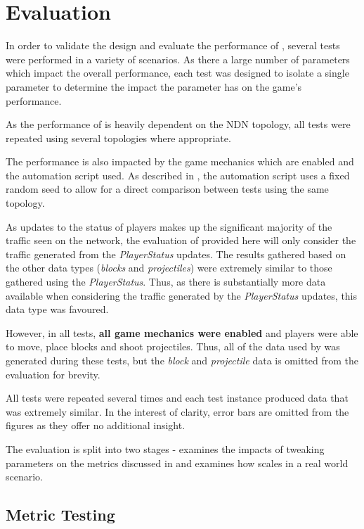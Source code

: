 \chapter{Evaluation}\label{sec:eval}
In order to validate the design and evaluate the performance of \game{}, several tests were performed in a variety of scenarios. As there a large number of parameters which impact the overall performance, each test was designed to isolate a single parameter to determine the impact the parameter has on the game's performance.

As the performance of \game{} is heavily dependent on the NDN topology, all tests were repeated using several topologies where appropriate.

The performance is also impacted by the game mechanics which are enabled and the automation script used. As described in , the automation script uses a fixed random seed to allow for a direct comparison between tests using the same topology.

As updates to the status of players makes up the significant majority of the traffic seen on the network, the evaluation of \game{} provided here will only consider the traffic generated from the \textit{PlayerStatus} updates. The results gathered based on the other data types (\textit{blocks} and \textit{projectiles}) were extremely similar to those gathered using the \textit{PlayerStatus}. Thus, as there is substantially more data available when considering the traffic generated by the \textit{PlayerStatus} updates, this data type was favoured. 

However, in all tests, \textbf{all game mechanics were enabled} and players were able to move, place blocks and shoot projectiles. Thus, all of the data used by \game{} was generated during these tests, but the \textit{block} and \textit{projectile} data is omitted from the evaluation for brevity.  

All tests were repeated several times and each test instance produced data that was extremely similar. In the interest of clarity, error bars are omitted from the figures as they offer no additional insight.

The evaluation is split into two stages -  examines the impacts of tweaking parameters on the metrics discussed in  and  examines how \game{} scales in a real world scenario.


\section{Metric Testing}\label{sec:eval:metrics-testing}

